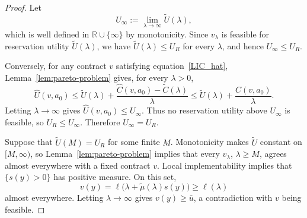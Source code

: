 \begin{proof}
Let
\[
    U_\infty:=\lim_{\lambda\to\infty}\widetilde U(\lambda),
\]
which is well defined in $\mathbb R\cup\{\infty\}$ by monotonicity.  Since
$v_\lambda$ is feasible for reservation utility $\widetilde U(\lambda)$, we
have $\widetilde U(\lambda)\leq U_R$ for every $\lambda$, and hence
$U_\infty\leq U_R$.

Conversely, for any contract $v$ satisfying equation~\eqref{LIC_hat}, Lemma~\ref{lem:pareto-problem} gives, for every $\lambda>0$,
\[
    \widehat U(v,a_0)
    \leq \widetilde U(\lambda)
       +\frac{\widehat C(v,a_0)-\widetilde C(\lambda)}{\lambda}
    \leq \widetilde U(\lambda)
       +\frac{\widehat C(v,a_0)}{\lambda}.
\]
Letting $\lambda\to\infty$ gives
$\widehat U(v,a_0)\leq U_\infty$.  Thus no reservation utility above
$U_\infty$ is feasible, so $U_R\leq U_\infty$.  Therefore
$U_\infty=U_R$.

Suppose that $\widetilde U(M)=U_R$ for some finite $M$.  Monotonicity makes
$\widetilde U$ constant on $[M,\infty)$, so Lemma~\ref{lem:pareto-problem} implies that every $v_\lambda$, $\lambda\geq M$,
agrees almost everywhere with a fixed contract $v$.  Local implementability
implies that $\{s(y)>0\}$ has positive measure.  On this set,
\[
    v(y)
    =\ell\bigl(\lambda+\widetilde\mu(\lambda)s(y)\bigr)
    \geq\ell(\lambda)
\]
almost everywhere.  Letting $\lambda\to\infty$ gives
$v(y)\geq\bar u$, a contradiction with $v$ being feasible.
\end{proof}

